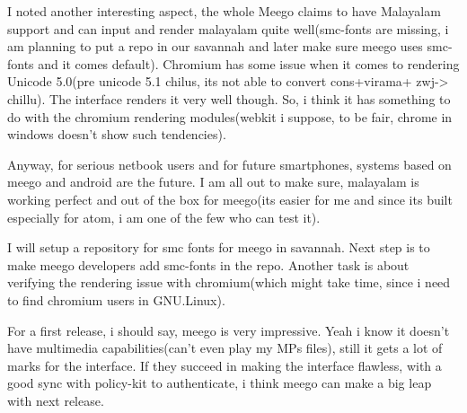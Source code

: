 I noted another interesting aspect, the whole Meego claims to have Malayalam support and can input and render malayalam quite well(smc-fonts are missing, i am planning to put a repo in our savannah and later make sure meego uses smc-fonts and it comes default). Chromium has some issue when it comes to rendering Unicode 5.0(pre unicode 5.1 chilus, its not able to convert cons+virama+ zwj-> chillu). The interface renders it very well though. So, i think it has something to do with the chromium rendering modules(webkit i suppose, to be fair, chrome in windows doesn’t show such tendencies).

Anyway, for serious netbook users and for future smartphones, systems based on meego and android are the future. I am all out to make sure, malayalam is working perfect and out of the box for meego(its easier for me and since its built especially for atom, i am one of the few who can test it).

I will setup a repository for smc fonts for meego in savannah. Next step is to make meego developers add smc-fonts in the repo. Another task is about verifying the rendering issue with chromium(which might take time, since i need to find chromium users in GNU.Linux).

For a first release, i should say, meego is very impressive. Yeah i know it doesn’t have multimedia capabilities(can’t even play my MPs files), still it gets a lot of marks for the interface. If they succeed in making the interface flawless, with a good sync with policy-kit to authenticate, i think meego can make a big leap with next release.


